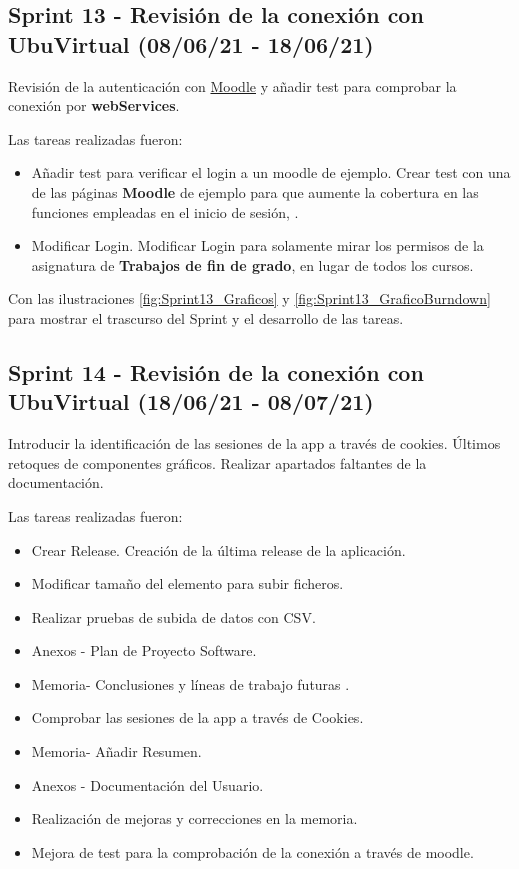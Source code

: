 \subsection{Sprint 13 - Revisión de la conexión con UbuVirtual (08/06/21 - 18/06/21)}
Revisión de la autenticación con \href{https://moodle.org/}{Moodle} y añadir test para comprobar la conexión por \textbf{webServices}.

Las tareas realizadas fueron:
\begin{itemize}
	\item Añadir test para verificar el login a un moodle de ejemplo.
		Crear test con una de las páginas \textbf{Moodle} de ejemplo para que aumente la cobertura en las funciones empleadas en el inicio de sesión, .
	\item Modificar Login.
		Modificar Login para solamente mirar los permisos de la asignatura de \textbf{Trabajos de fin de grado}, en lugar de todos los cursos.
\end{itemize}

Con las ilustraciones \ref{fig:Sprint13_Graficos} y \ref{fig:Sprint13_GraficoBurndown} para mostrar el trascurso del Sprint y el desarrollo de las tareas.


\subsection{Sprint 14 - Revisión de la conexión con UbuVirtual (18/06/21 - 08/07/21)}
Introducir la identificación de las sesiones de la app a través de cookies. Últimos retoques de componentes gráficos. Realizar apartados faltantes de la documentación.

Las tareas realizadas fueron:
\begin{itemize}
	\item Crear Release. Creación de la última release de la aplicación.
	\item Modificar tamaño del elemento para subir ficheros.
	\item Realizar pruebas de subida de datos con CSV.
	\item Anexos - Plan de Proyecto Software.
	\item Memoria- Conclusiones y líneas de trabajo futuras .
	\item Comprobar las sesiones de la app a través de Cookies.
	\item Memoria- Añadir Resumen. 
	\item Anexos - Documentación del Usuario.
	\item Realización de mejoras y correcciones en la memoria.
	\item Mejora de test para la comprobación de la conexión a través de moodle.
\end{itemize}

